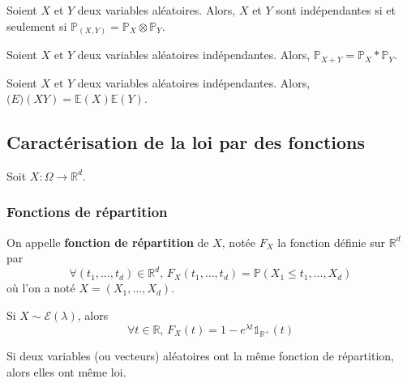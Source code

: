 	\begin{theorem}
		Soient $X$ et $Y$ deux variables aléatoires. Alors, $X$ et $Y$ sont indépendantes si et seulement si $\mathbb{P}_{(X,Y)} = \mathbb{P}_X \otimes \mathbb{P}_Y$.
	\end{theorem}

	\begin{corollary}
		Soient $X$ et $Y$ deux variables aléatoires indépendantes. Alors, $\mathbb{P}_{X+Y} = \mathbb{P}_X * \mathbb{P}_Y$.
	\end{corollary}

	\begin{proposition}
		Soient $X$ et $Y$ deux variables aléatoires indépendantes. Alors, $\mathbb(E)(XY) = \mathbb{E}(X) \mathbb{E}(Y)$.
	\end{proposition}

	\newpage

	\subsection{Caractérisation de la loi par des fonctions}

	Soit $X : \Omega \rightarrow \mathbb{R}^d$.

	\subsubsection{Fonctions de répartition}


	\begin{definition}
		On appelle \textbf{fonction de répartition} de $X$, notée $F_X$ la fonction définie sur $\mathbb{R}^d$ par
		\[ \forall (t_1, \dots, t_d) \in \mathbb{R}^d, \, F_X(t_1, \dots, t_d) = \mathbb{P}(X_1 \leq t_1, \dots, X_d) \]
		où l'on a noté $X = (X_1, \dots, X_d)$.
	\end{definition}


	\begin{example}
		Si $X \sim \mathcal{E}(\lambda)$, alors
		\[ \forall t \in \mathbb{R}, \, F_X(t) = 1 - e^{\lambda t} \mathbb{1}_{\mathbb{R}^+}(t) \]
	\end{example}


	\begin{theorem}
		Si deux variables (ou vecteurs) aléatoires ont la même fonction de répartition, alors elles ont même loi.
	\end{theorem}

